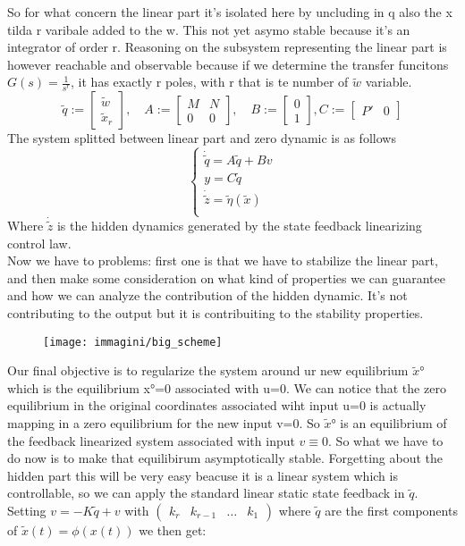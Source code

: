 So for what concern the linear part it's isolated here by uncluding in q also the x tilda r varibale added to the w. This not yet asymo stable because it's an integrator of order r. Reasoning on the subsystem representing the linear part is however reachable and observable because if we determine the transfer funcitons $G(s)=\frac{1}{s^r}$, it has exactly r poles, with r that is  te number of $\tilde{w}$ variable.
\[
\tilde{q}:=\begin{bmatrix}
	\tilde{w}\\
	\tilde{x}_r
\end{bmatrix}, \quad A:= \begin{bmatrix}
M & N \\
0 & 0
\end{bmatrix}, \quad B:=\begin{bmatrix}
0 \\
1
\end{bmatrix}, C:=\begin{bmatrix}
P' & 0
\end{bmatrix}
\]The system splitted between linear part and zero dynamic is as follows
\begin{equation*}
	\left\{
	\begin{array}{ll}	
		\dot{\tilde{q}}=A\tilde{q}+Bv\\
		y=C\tilde{q}\\
		\boxed{\dot{\tilde{z}}=\tilde{\eta}(\tilde{x})}\\
	\end{array}
	\right.
\end{equation*} Where $\dot{\tilde{z}}$ is the hidden dynamics generated by the state feedback linearizing control law.\\Now we have to problems: first one is that we have to stabilize the linear part, and then make some consideration on what kind of properties we can guarantee and how we can analyze the contribution of the hidden dynamic. It's not contributing to the output but it is contribuiting to the stability properties.
\begin{figure}[H]
	\centering
	\texttt{[image: immagini/big\_scheme]}
	\caption{}
	\label{fig:bigscheme}
\end{figure}
Our final objective is to regularize the system around ur new equilibrium $\tilde{x}°$ which is the equilibrium x°=0 associated with u=0. We can notice that the zero equilibrium in the original coordinates associated wiht input u=0 is actually mapping
in a zero equilibrium for the new input v=0. So $\tilde{x}°$ is an equilibrium of the feedback linearized system associated with input $v \equiv 0$. So what we have to do now is to make that equilibirum asymptotically stable. Forgetting about the hidden part this will be very easy beacuse it is a linear system which is controllable, so we can apply the standard linear static state feedback in $\tilde{q}$. Setting $v=-K\tilde{q}+v$ with $\begin{pmatrix}
	k_r & k_{r-1} & \dots & k_1
\end{pmatrix}$ where $\tilde{q}$ are the first components of $\tilde{x}(t)=\phi(x(t))$ we then get: 
